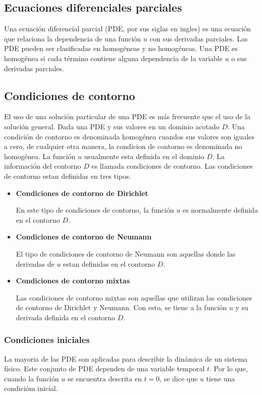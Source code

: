\subsection{Ecuaciones diferenciales parciales}

Una ecuación diferencial parcial (PDE, por sus siglas en ingles) es una ecuación que relaciona la dependencia de una función $u$ con sus derivadas parciales\cite{sommerfeld_1949}. Las PDE pueden ser clasificadas en homogéneas y no homogéneas. Una PDE es homogénea si cada término contiene alguna dependencia de la variable $u$ o sus derivadas parciales.

\subsection{Condiciones de contorno}

El uso de una solución particular de una PDE es más frecuente que el uso de la solución general. Dada una PDE y sus valores en un dominio acotado $D$\cite{wazwaz_2002}. Una condición de contorno es denominada homogénea cuandos sus valores son iguales a cero, de cualquier otra manera, la condicion de contorno es denominada no homogénea. La función $u$ usualmente esta definida en el dominio $D$. La información del contorno $D$ es llamada condiciones de contorno. Las condiciones de contorno estan definidas en tres tipos.

\begin{itemize}
    \item \textbf{Condiciones de contorno de Dirichlet}

          En este tipo de condiciones de contorno, la función $u$ es normalmente definida en el contorno $D$.
    \item \textbf{Condiciones de contorno de Neumann}

          El tipo de condiciones de contorno de Neumann son aquellas donde las derivadas de $u$ estan definidas en el contorno $D$.
    \item \textbf{Condiciones de contorno mixtas}

          Las condiciones de contorno mixtas son aquellas que utilizan las condiciones de contorno de Dirichlet y Neumann. Con esto, se tiene a la función $u$ y su derivada definida en el contorno $D$.
\end{itemize}

\subsubsection{Condiciones iniciales}

La mayoria de las PDE son aplicadas para describir la dinámica de un sistema físico. Este conjunto de PDE dependen de una variable temporal $t$. Por lo que, cuando la función $u$ se encuentra descrita en $t=0$, se dice que $u$ tiene una condicióm inicial.